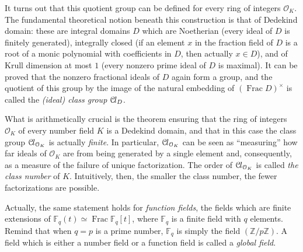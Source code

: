 \documentclass[a4paper,USenglish,cleveref, autoref, thm-restate]{lipics-v2021}
\newcommand*{\OK}[1][K]{\mathcal{O}_{#1}}
\newcommand*{\Cl}{\mathcal{C}\kern-.075em l}
\newcommand*{\Fq}[1][q]{\mathbb{F}_{#1}}
\newcommand{\Z}{\mathbb{Z}}
\DeclareMathOperator{\Frac}{Frac}
\begin{document}
It turns out that this quotient group can be %
defined for every ring of integers $\OK$.
The fundamental theoretical notion beneath this construction is that of Dedekind domain: these are integral domains $D$ which are Noetherian (every ideal of $D$ is finitely generated), integrally closed (if an element $x$ in the fraction field of $D$ is a root of a monic polynomial with coefficients in $D$, then actually $x \in D$), and of Krull dimension at most $1$ (every nonzero prime ideal of $D$ is maximal).
It can be proved that the nonzero fractional ideals of $D$ %
again form a group, and the quotient of this group by the image of the natural embedding of $(\Frac D)^\times$ is called the \emph{\textup{(}ideal\textup{)} class group} $\Cl_{D}$.

What is arithmetically crucial is the theorem ensuring that the ring of integers $\OK$ of every number field $K$ is a Dedekind domain,
and that in this case the class group $\Cl_{\OK}$ is actually \emph{finite}.
In particular, $\Cl_{\OK}$ can be seen as ``measuring'' how far ideals of $\OK$ are from being generated by a single element and,
consequently, as a measure of the failure of unique factorization.
The order of $\Cl_{\OK}$ is called \emph{the class number} of $K$.
Intuitively, then, the smaller the class number, the fewer factorizations are possible.

Actually, the same statement holds for \emph{function fields}, the fields which are finite extensions of $\Fq(t) \simeq \Frac \Fq[q][t]$, where $\Fq$ is a finite field with $q$ elements. Remind that when $q=p$ is a prime number, $\Fq$ is simply the field $(\Z/p\Z)$. 
A field which is either a number field or a function field is called a \emph{global field}.
\end{document}
